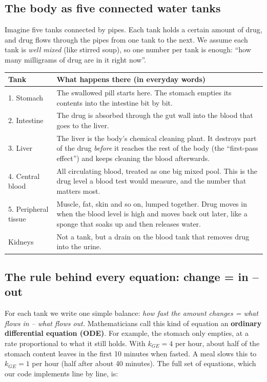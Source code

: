 \documentclass[10.5pt]{article}
\begin{document}
\subsection{The body as five connected water tanks}
Imagine five tanks connected by pipes. Each tank holds a certain amount of drug, and drug flows through the pipes
from one tank to the next. We assume each tank is \emph{well mixed} (like stirred soup), so one number per tank is
enough: ``how many milligrams of drug are in it right now''.

\begin{center}\small
\begin{tabularx}{\linewidth}{@{}l X@{}}
\toprule
\textbf{Tank} & \textbf{What happens there (in everyday words)}\\\midrule
1. Stomach & The swallowed pill starts here. The stomach empties its contents into the intestine bit by bit.\\
2. Intestine & The drug is absorbed through the gut wall into the blood that goes to the liver.\\
3. Liver & The liver is the body's chemical cleaning plant. It destroys part of the drug \emph{before} it reaches
the rest of the body (the ``first-pass effect'') and keeps cleaning the blood afterwards.\\
4. Central blood & All circulating blood, treated as one big mixed pool. This is the drug level a blood test
would measure, and the number that matters most.\\
5. Peripheral tissue & Muscle, fat, skin and so on, lumped together. Drug moves in when the blood level is high and
moves back out later, like a sponge that soaks up and then releases water.\\
Kidneys & Not a tank, but a drain on the blood tank that removes drug into the urine.\\
\bottomrule
\end{tabularx}
\end{center}

\subsection{The rule behind every equation: change = in -- out}
For each tank we write one simple balance: \emph{how fast the amount changes = what flows in -- what flows out.}
Mathematicians call this kind of equation an \textbf{ordinary differential equation (ODE)}. For example, the stomach
only empties, at a rate proportional to what it still holds. With $k_{GE}=4$ per hour, about half of the stomach
content leaves in the first 10 minutes when fasted. A meal slows this to $k_{GE}=1$ per hour (half after about
40 minutes). The full set of equations, which our code implements line by line, is:
\end{document}
